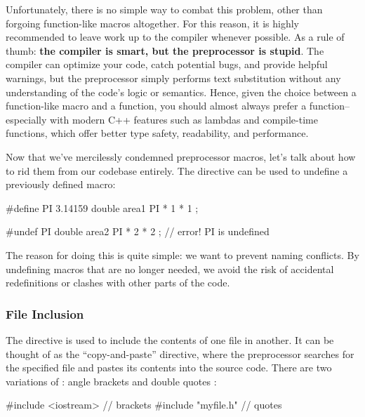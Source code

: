 \documentclass[12pt]{article}
\begin{document}
\begin{advice}
\noindent
Unfortunately, there is no simple way to combat this problem, other than forgoing function-like macros altogether.
For this reason, it is highly recommended to leave work up to the compiler whenever possible.
As a rule of thumb: \textbf{the compiler is smart, but the preprocessor is stupid}.
The compiler can optimize your code, catch potential bugs, and provide helpful warnings, but the preprocessor simply performs text substitution without any understanding of the code's logic or semantics.
Hence, given the choice between a function-like macro and a function, you should almost always prefer a function--especially with modern C++ features such as lambdas and compile-time functions, which offer better type safety, readability, and performance.
\end{advice}

\noindent
Now that we've mercilessly condemned preprocessor macros, let's talk about how to rid them from our codebase entirely.
The  directive can be used to undefine a previously defined macro:

\begin{cxx}{}
#define PI 3.14159
double area1 { PI * 1 * 1 };

#undef PI
double area2 { PI * 2 * 2 }; // error! PI is undefined
\end{cxx}

\noindent
The reason for doing this is quite simple: we want to prevent naming conflicts.
By undefining macros that are no longer needed, we avoid the risk of accidental redefinitions or clashes with other parts of the code.

\subsubsection{File Inclusion }
\label{sec:file-inclusion}

\noindent
The  directive is used to include the contents of one file in another.
It can be thought of as the ``copy-and-paste'' directive, where the preprocessor searches for the specified file and pastes its contents into the source code.
There are two variations of : angle brackets \inlinecxx{<>} and double quotes :

\begin{cxx}{}
#include <iostream> // brackets
#include "myfile.h" // quotes
\end{cxx}
\end{document}
